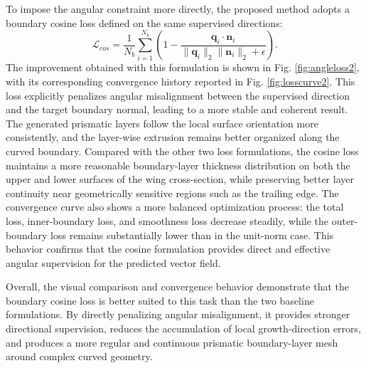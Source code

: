\documentclass[%
 aip,
 amsmath,amssymb,
 reprint,%
nobibnotes,
]{revtex4-1}
\begin{document}
To impose the angular constraint more directly, the proposed method adopts a boundary cosine loss defined on the same supervised directions:
\begin{equation}
    \mathcal{L}_{cos}
    =
    \frac{1}{N_b}
    \sum_{i=1}^{N_b}
    \left(
    1-
    \frac{
    \mathbf{q}_i\cdot\mathbf{n}_i
    }{
    \|\mathbf{q}_i\|_2\|\mathbf{n}_i\|_2+\epsilon
    }
    \right).
\end{equation}
The improvement obtained with this formulation is shown in Fig. \ref{fig:angleloss2}, with its corresponding convergence history reported in Fig. \ref{fig:losscurve2}. This loss explicitly penalizes angular misalignment between the supervised direction and the target boundary normal, leading to a more stable and coherent result. The generated prismatic layers follow the local surface orientation more consistently, and the layer-wise extrusion remains better organized along the curved boundary. Compared with the other two loss formulations, the cosine loss maintains a more reasonable boundary-layer thickness distribution on both the upper and lower surfaces of the wing cross-section, while preserving better layer continuity near geometrically sensitive regions such as the trailing edge.
The convergence curve also shows a more balanced optimization process: the total loss, inner-boundary loss, and smoothness loss decrease steadily, while the outer-boundary loss remains substantially lower than in the unit-norm case.
This behavior confirms that the cosine formulation provides direct and effective angular supervision for the predicted vector field.

Overall, the visual comparison and convergence behavior demonstrate that the boundary cosine loss is better suited to this task than the two baseline formulations. By directly penalizing angular misalignment, it provides stronger directional supervision, reduces the accumulation of local growth-direction errors, and produces a more regular and continuous prismatic boundary-layer mesh around complex curved geometry.

\end{document}

